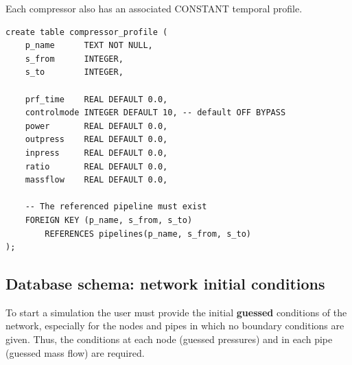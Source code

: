 Each compressor also has an associated CONSTANT temporal profile.
\begin{verbatim}
create table compressor_profile (
    p_name      TEXT NOT NULL,
    s_from      INTEGER,
    s_to        INTEGER,

    prf_time    REAL DEFAULT 0.0,
    controlmode INTEGER DEFAULT 10, -- default OFF BYPASS
    power       REAL DEFAULT 0.0,
    outpress    REAL DEFAULT 0.0,
    inpress     REAL DEFAULT 0.0,
    ratio       REAL DEFAULT 0.0,
    massflow    REAL DEFAULT 0.0,

    -- The referenced pipeline must exist
    FOREIGN KEY (p_name, s_from, s_to)
        REFERENCES pipelines(p_name, s_from, s_to)
);
\end{verbatim}

\subsection{Database schema: network initial conditions}

To start a simulation the user must provide the initial \textbf{guessed} conditions of the network, especially for the nodes and pipes in which no boundary conditions are given.
Thus, the conditions at each node (guessed pressures) and in each pipe (guessed mass flow) are required.

